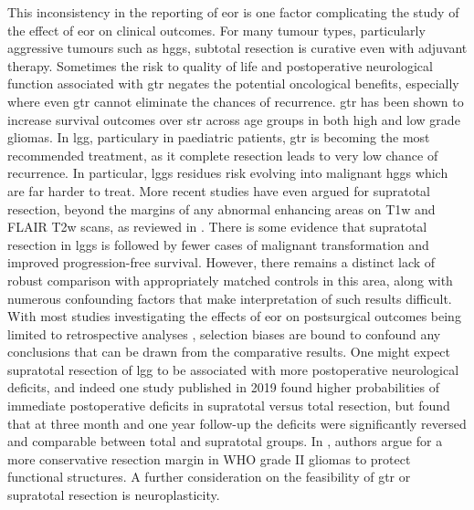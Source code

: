 This inconsistency in the reporting of \gls{eor} is one factor complicating the study of the effect of \gls{eor} on clinical outcomes.
For many tumour types, particularly aggressive tumours such as \glspl{hgg}, subtotal resection is  curative even with adjuvant therapy.
Sometimes the risk to quality of life and postoperative neurological function associated with \gls{gtr} negates the potential oncological benefits, especially where even \gls{gtr} cannot eliminate the chances of recurrence.
\Gls{gtr} has been shown to increase survival outcomes over \gls{str} across age groups in both high\autocite{Hatoum2022, Han2020, Adams2016, McCrea2015, Block2012, McGirt2009, Kramm2006} and low grade \autocite{Keles2001, Pollack1995, Sanai2008} gliomas.
In \gls{lgg}, particulary in paediatric patients, \gls{gtr} is becoming the most recommended treatment, as it complete resection leads to very low chance of recurrence.\autocite{Berger1994}
In particular, \glspl{lgg} residues risk evolving into malignant \glspl{hgg} which are far harder to treat.
More recent studies have even argued for supratotal resection, beyond the margins of any abnormal enhancing areas on T1w and FLAIR T2w scans, as reviewed in \textcite{deLeeuw2019}.
There is some evidence \autocite{Yordanova2011} that supratotal resection in \glspl{lgg} is followed by fewer cases of malignant transformation and improved progression-free survival.
However, there remains a distinct lack of robust comparison with appropriately matched controls in this area, along with numerous confounding factors that make interpretation of such results difficult.
With most studies investigating the effects of \gls{eor} on postsurgical outcomes being limited to retrospective analyses , selection biases are bound to confound any conclusions that can be drawn from the comparative results.\autocite{deLeeuw2019,Keles2001}
One might expect supratotal resection of \gls{lgg} to be associated with more postoperative neurological deficits, and indeed one study published in 2019 found higher probabilities of immediate postoperative deficits in supratotal versus total resection, but found that at three month and one year follow-up the deficits were significantly reversed and comparable between total and supratotal groups.\autocite{Rossi2019a}
In \textcite{Gil-Robles2010}, authors argue for a more conservative resection margin in WHO grade II gliomas to protect functional structures.
A further consideration on the feasibility of \gls{gtr} or supratotal resection is neuroplasticity.
